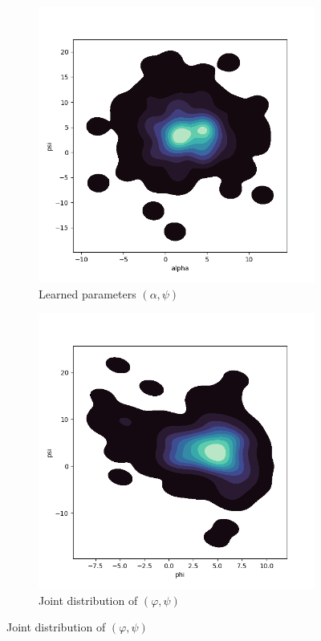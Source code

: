 \documentclass[a4paper,12pt]{article}
\theoremstyle{definition}
\begin{document}
\begin{figure}[htbp]
    \begin{subfigure}[b]{0.45\textwidth}
        \centering
        \includegraphics[width=\textwidth]{VariableSelectionPsi/joint_alpha_psi.png}
        \caption{Learned parameters \((\alpha, \psi)\)}
        \label{fig:joint_alpha_psi}
    \end{subfigure}
    \hfill
    \begin{subfigure}[b]{0.45\textwidth}
        \centering
        \includegraphics[width=\textwidth]{VariableSelectionPsi/joint_phi_psi.png}
        \caption{Joint distribution of \((\varphi, \psi)\)}
        \label{fig:joint_phi_psi}
    \end{subfigure}


\end{figure}
\end{document}
